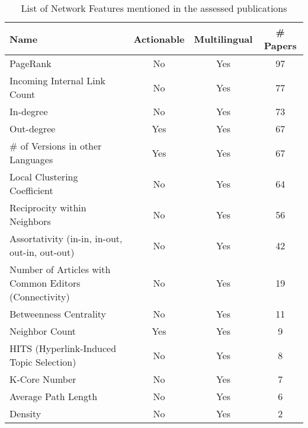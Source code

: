 \begin{table}[htbp]
    \caption{List of Network Features mentioned in the assessed publications}
    \label{tab:feat_Network}
    \centering
    \begin{tabular}{m{} c c c}
        \toprule
        \textbf{Name} & \textbf{Actionable} & \textbf{Multilingual} & \textbf{\# Papers} \\ 
        \midrule
        PageRank & No & Yes & 97 \\
        Incoming Internal Link Count & No & Yes & 77 \\
        In-degree & No & Yes & 73 \\
        Out-degree & Yes & Yes & 67 \\
        \# of Versions in other Languages & Yes & Yes & 67 \\
        Local Clustering Coefficient & No & Yes & 64 \\
        Reciprocity within Neighbors & No & Yes & 56 \\
        Assortativity (in-in, in-out, out-in, out-out) & No & Yes & 42 \\
        Number of Articles with Common Editors (Connectivity) & No & Yes & 19 \\
        Betweenness Centrality & No & Yes & 11 \\
        Neighbor Count & Yes & Yes & 9 \\
        HITS (Hyperlink-Induced Topic Selection) & No & Yes & 8 \\
        K-Core Number & No & Yes & 7 \\
        Average Path Length & No & Yes & 6 \\
        Density & No & Yes & 2 \\
        \bottomrule
    \end{tabular}
\end{table}